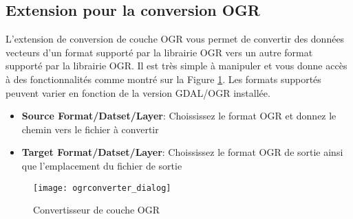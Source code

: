 ﻿%

\subsection{Extension pour la conversion OGR}

L'extension de conversion de couche OGR vous permet de convertir des donn\'ees vecteurs d'un format support\'e par la librairie OGR
vers un autre format support\'e par la librairie OGR. Il est tr\`es simple \`a manipuler et vous donne acc\`es \`a des fonctionnalit\'es
comme montr\'e sur la Figure \ref{fig:ogrconverter_dialog}. Les formats support\'es peuvent varier en fonction de la version GDAL/OGR install\'ee.


\begin{itemize}
\item \textbf{Source Format/Datset/Layer}: Choississez le format OGR et donnez le chemin vers le fichier \`a convertir
\item \textbf{Target Format/Datset/Layer}: Choississez le format OGR de sortie ainsi que l'emplacement du fichier de sortie
\end{itemize}

\begin{figure}[ht]
   \begin{center}
   \caption{Convertisseur de couche OGR \nixcaption}\label{fig:ogrconverter_dialog}\smallskip
   \texttt{[image: ogrconverter\_dialog]}
\end{center}  
\end{figure}

